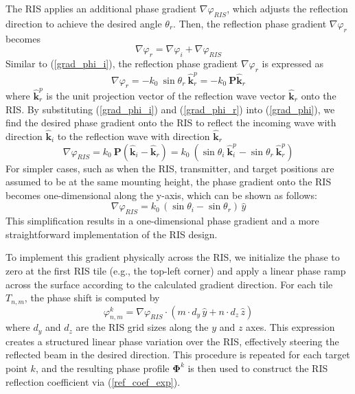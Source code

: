 \documentclass{IEEEoj}
\begin{document}
The RIS applies an additional phase gradient $\nabla \varphi_{RIS}$, which adjusts the reflection direction to achieve the desired angle $\theta_r$. Then, the reflection phase gradient $\nabla \varphi_r$ becomes
\begin{equation} \label{grad_phi}
	\nabla \varphi_r = \nabla \varphi_i + \nabla \varphi_{RIS}
\end{equation}
Similar to (\ref{grad_phi_i}), the reflection phase gradient $\nabla \varphi_r$ is expressed as
\begin{equation} \label{grad_phi_r}
	\nabla \varphi_r = - k_0 \ \sin\theta_r \ \mathbf{\hat{k}}_r^p = - k_0 \ \textbf{P} \mathbf{\hat{k}}_r
\end{equation}
where $\mathbf{\hat{k}}_r^p$ is the unit projection vector of the reflection wave vector \( \mathbf{\hat{k}}_r \) onto the RIS. By substituting (\ref{grad_phi_i}) and (\ref{grad_phi_r}) into (\ref{grad_phi}), we find the desired phase gradient onto the RIS to reflect the incoming wave with direction $\mathbf{\hat{k}}_i$ to the reflection wave with direction $\mathbf{\hat{k}}_r$
\begin{equation} \label{grad_exp}
	\nabla \varphi_{RIS} = k_0 \ \textbf{P} (\mathbf{\hat{k}}_i - \mathbf{\hat{k}}_r) = k_0 \ (\sin\theta_i \ \mathbf{\hat{k}}_i^p - \sin\theta_r \ \mathbf{\hat{k}}_r^p)
\end{equation}
For simpler cases, such as when the RIS, transmitter, and target positions are assumed to be at the same mounting height, the phase gradient onto the RIS becomes one-dimensional along the y-axis, which can be shown as follows:
\begin{equation} \label{grad_exp_simpler}
	\nabla \varphi_{RIS} = k_0 \, (\sin\theta_i - \sin\theta_r) \, \hat{y}
\end{equation}
This simplification results in a one-dimensional phase gradient and a more straightforward implementation of the RIS design.

To implement this gradient physically across the RIS, we initialize the phase to zero at the first RIS tile (e.g., the top-left corner) and apply a linear phase ramp across the surface according to the calculated gradient direction. For each tile $T_{n,m}$, the phase shift is computed by
\begin{equation}
	\varphi_{n,m}^k = \nabla \varphi_{RIS} \cdot (m \cdot d_y \, \hat{y} + n \cdot d_z \, \hat{z})
\end{equation}
where $d_y$ and $d_z$ are the RIS grid sizes along the $y$ and $z$ axes. This expression creates a structured linear phase variation over the RIS, effectively steering the reflected beam in the desired direction. This procedure is repeated for each target point $k$, and the resulting phase profile $\mathbf{\Phi}^k$ is then used to construct the RIS reflection coefficient via (\ref{ref_coef_exp}).
 
\end{document}

